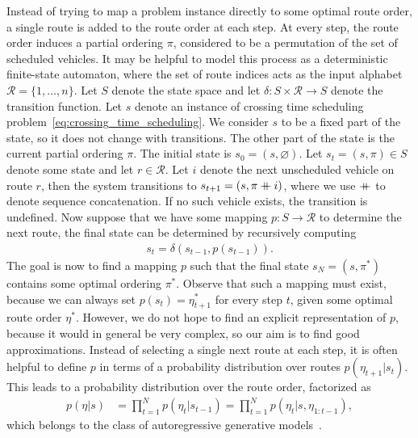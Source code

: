 \documentclass[a4paper]{article}
\newcommand\mdoubleplus{\mathbin{+\mkern-10mu+}}
\theoremstyle{definition}
\theoremstyle{plain}
\begin{document}
Instead of trying to map a problem instance directly to some optimal route
order, a single route is added to the route order at each step. At every step,
the route order induces a partial ordering $\pi$, considered to be a permutation
of the set of scheduled vehicles.
%
It may be helpful to model this
process as a deterministic finite-state automaton, where the set of route
indices acts as the input alphabet $\mathcal{R} = \{ 1, \dots, n \}$. Let $S$ denote
the state space and let $\delta: S \times \mathcal{R} \rightarrow S$ denote the transition function.
Let $s$ denote an instance of crossing time scheduling
problem~\eqref{eq:crossing_time_scheduling}. We consider $s$ to be a fixed part
of the state, so it does not change with transitions. The other part of the
state is the current partial ordering $\pi$. The initial state is
$s_{0} = (s, \varnothing)$.
Let $s_{t} = (s, \pi) \in S$ denote some state and let $r \in \mathcal{R}$. Let $i$
denote the next unscheduled vehicle on route $r$, then the system transitions to
$s_{t+1} = (s, \pi \mdoubleplus i)$, where we use $\mdoubleplus$ to denote sequence
concatenation. If no such vehicle exists, the transition is undefined.
%
Now suppose that we have some mapping $p : S \rightarrow \mathcal{R}$ to
determine the next route, the final state can be determined by recursively
computing
\begin{align*}
  s_{t} = \delta(s_{t-1}, p(s_{t-1})) .
\end{align*}
%
The goal is now to find a mapping $p$ such that the final state
$s_{N} = (s, \pi^{*})$ contains some optimal ordering $\pi^{*}$.
%
Observe that such a mapping must exist, because we can always set
$p(s_{t}) = \eta^{*}_{t+1}$ for every step $t$, given some optimal route order
$\eta^{*}$. However, we do not hope to find an explicit representation of $p$,
because it would in general be very complex, so our aim is to find good
approximations.
%
Instead of selecting a single next route at each step, it is often helpful to
define $p$ in terms of a probability distribution over routes
$p(\eta_{t+1} | s_{t})$. This leads to a probability distribution over the route
order, factorized as
\begin{align*}
  p(\eta | s) &= \prod_{t=1}^{N} p(\eta_{t} | s_{t-1}) = \prod_{t=1}^{N} p(\eta_{t} | s, \eta_{1:t-1}) ,
\end{align*}
which belongs to the class of autoregressive generative
models~\cite{tomczakDeepGenerativeModeling2024}.
\end{document}
